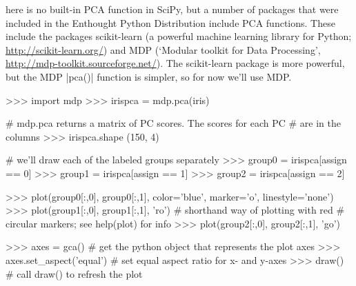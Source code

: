 here is no built-in PCA function in SciPy, but a number of packages that were included in the Enthought Python Distribution include PCA functions.  These include the packages scikit-learn (a powerful machine learning library for Python; \url{http://scikit-learn.org/}) and MDP (`Modular toolkit for Data Processing', \url{http://mdp-toolkit.sourceforge.net/}).  The scikit-learn package is more powerful, but the MDP |pca()| function is simpler, so for now we'll use MDP.
%
\begin{python}
>>> import mdp
>>> irispca = mdp.pca(iris)

# mdp.pca returns a matrix of PC scores.  The scores for each PC
# are in the columns
>>> irispca.shape
(150, 4)

# we'll draw each of the labeled groups separately
>>> group0 = irispca[assign == 0]
>>> group1 = irispca[assign == 1]
>>> group2 = irispca[assign == 2]

>>> plot(group0[:,0], group0[:,1], color='blue', marker='o', linestyle='none')
>>> plot(group1[:,0], group1[:,1], 'ro')  # shorthand way of plotting with red
                                          # circular markers; see help(plot) for info
>>> plot(group2[:,0], group2[:,1], 'go')

>>> axes = gca()  # get the python object that represents the plot axes
>>> axes.set_aspect('equal') # set equal aspect ratio for x- and y-axes
>>> draw()  # call draw() to refresh the plot
\end{python}

